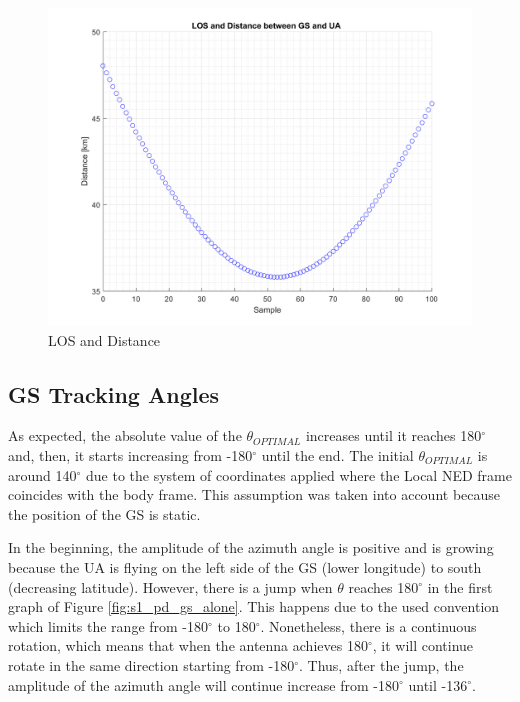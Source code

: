 \begin{figure}[H]
	\centering
	\includegraphics[scale=0.7]{figures/s1_los.png}
	\caption{LOS and Distance}
	\label{fig:s1_los}
\end{figure}

\subsection*{GS Tracking Angles}\label{GroundStation_scenario1}
As expected, the absolute value of the $\theta_{OPTIMAL}$ increases until it reaches 180$^{\circ}$  and, then, it starts increasing from -180$^{\circ}$ until the end. The initial $\theta_{OPTIMAL}$ is around 140$^{\circ}$ due to the system of coordinates applied where the Local NED frame coincides with the body frame. This assumption was taken into account because the position of the GS is static.

In the beginning, the amplitude of the azimuth angle is positive and is growing because the UA is flying on the left side of the GS (lower longitude) to south (decreasing latitude). However, there is a jump when $\theta$ reaches 180$^{\circ}$ in the first graph of Figure \ref{fig:s1_pd_gs_alone}. This happens due to the used convention which limits the range from -180$^{\circ}$ to 180$^{\circ}$. Nonetheless, there is a continuous rotation, which means that when the antenna achieves 180$^{\circ}$, it will continue rotate in the same direction starting from -180$^{\circ}$. Thus, after the jump, the amplitude of the azimuth angle will continue increase from -180$^{\circ}$ until -136$^{\circ}$.


